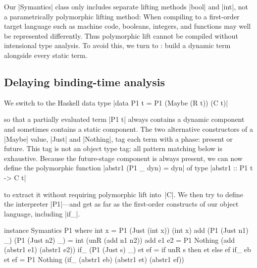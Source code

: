 Our |Symantics| class only includes separate lifting methods |bool| and
|int|, not a parametrically polymorphic lifting method:
When compiling to a first-order target language such as machine code,
booleans, integers, and functions may well be represented differently.
Thus polymorphic lift cannot be compiled without intensional type
analysis.  To avoid this, we turn to
\citet[see also \citealp{sumii-hybrid}]{asai-binding-time}:
build a dynamic term
alongside every static term.

\subsection{Delaying binding-time analysis}
\label{S:PE-problem}

We switch to the Haskell data type
|data P1 t = P1 (Maybe (R t)) (C t)|
\begin{comment}
\begin{code}
data P1 t = P1 (Maybe (R t)) (C t)
\end{code}
\end{comment}
so that a partially evaluated term |P1 t| always contains a dynamic
component and sometimes contains a static component.  The two
alternative constructors of a |Maybe| value, |Just| and |Nothing|,
tag each term with a phase: present or
future.  This tag is not an object type tag: all pattern matching below
is exhaustive.  Because the future-stage component is always present, we
can now define the polymorphic function
|abstr1 (P1 _ dyn) = dyn| of type
|abstr1 :: P1 t -> C t|
\begin{comment}
\begin{code}
abstr1 :: P1 t -> C t
abstr1 (P1 _ dyn) = dyn
\end{code}
\end{comment}
to extract it without requiring polymorphic lift into~|C|.  We then try
to define the interpreter |P1|---and get as far as the first-order
constructs of our object language, including |if_|.
\vspace*{-0.7em}
\begin{code3}
instance Symantics P1 where
  int  x = P1 (Just (int x)) (int x)
  add (P1 (Just n1) _) (P1 (Just n2) _) = int (unR (add n1 n2))
  add e1 e2 = P1 Nothing (add (abstr1 e1) (abstr1 e2))
  if_ (P1 (Just s) _) et ef = if unR s then et else ef
  if_ eb et ef = P1 Nothing (if_ (abstr1 eb) (abstr1 et) (abstr1 ef))
\end{code3}
\vspace*{-0.7em}
